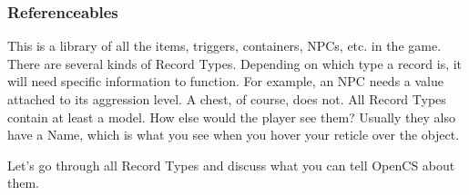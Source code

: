 \subsubsection{Referenceables}

This is a library of all the items, triggers, containers, NPCs, etc. in the game. There are several kinds of Record Types. Depending on which type a record is, it will need specific information to function. For example, an NPC needs a value attached to its aggression level. A chest, of course, does not. All Record Types contain at least a model. How else would the player see them? Usually they also have a Name, which is what you see when you hover your reticle over the object.

Let's go through all Record Types and discuss what you can tell OpenCS about them.

